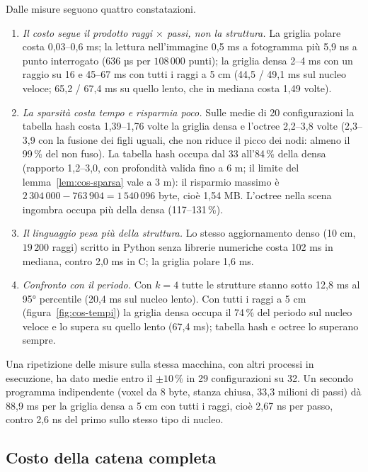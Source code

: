 Dalle misure seguono quattro constatazioni.
\begin{enumerate}
\item \emph{Il costo segue il prodotto raggi $\times$ passi, non la struttura.} La griglia polare costa 0,03--0,6 ms; la lettura nell'immagine 0,5 ms a fotogramma più 5,9 ns a punto interrogato (636 µs per $108\,000$ punti); la griglia densa 2--4 ms con un raggio su 16 e 45--67 ms con tutti i raggi a 5 cm (44,5 / 49,1 ms sul nucleo veloce; 65,2 / 67,4 ms su quello lento, che in mediana costa 1,49 volte).
\item \emph{La sparsità costa tempo e risparmia poco.} Sulle medie di 20 configurazioni la tabella hash costa 1,39--1,76 volte la griglia densa e l'octree 2,2--3,8 volte (2,3--3,9 con la fusione dei figli uguali, che non riduce il picco dei nodi: almeno il 99\,\% del non fuso). La tabella hash occupa dal 33 all'84\,\% della densa (rapporto 1,2--3,0, con profondità valida fino a 6 m; il limite del lemma~\ref{lem:cos-sparsa} vale a 3 m): il risparmio massimo è $2\,304\,000-763\,904=1\,540\,096$ byte, cioè 1,54 MB. L'octree nella scena ingombra occupa più della densa (117--131\,\%).
\item \emph{Il linguaggio pesa più della struttura.} Lo stesso aggiornamento denso (10 cm, $19\,200$ raggi) scritto in Python senza librerie numeriche costa 102 ms in mediana, contro 2,0 ms in C; la griglia polare 1,6 ms.
\item \emph{Confronto con il periodo.} Con $k=4$ tutte le strutture stanno sotto 12,8 ms al 95° percentile (20,4 ms sul nucleo lento). Con tutti i raggi a 5 cm (figura~\ref{fig:cos-tempi}) la griglia densa occupa il 74\,\% del periodo sul nucleo veloce e lo supera su quello lento (67,4 ms); tabella hash e octree lo superano sempre.
\end{enumerate}
Una ripetizione delle misure sulla stessa macchina, con altri processi in esecuzione, ha dato medie entro il $\pm10\,\%$ in 29 configurazioni su 32. Un secondo programma indipendente (voxel da 8 byte, stanza chiusa, 33,3 milioni di passi) dà 88,9 ms per la griglia densa a 5 cm con tutti i raggi, cioè 2,67 ns per passo, contro 2,6 ns del primo sullo stesso tipo di nucleo.

\subsection{Costo della catena completa}\label{sec:cos-catena}


